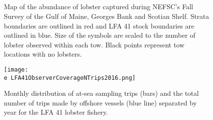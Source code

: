 \documentclass[11pt]{article}
\newcommand{\D}{.}
\newcommand{\e}{/backup/bio_data/bio.lobster/figures/} %
\begin{document}
        \begin{figure}
        \centering
        \\
        \\
        \\
        \\


         \caption{Map of the abundance of lobster captured during NEFSC's Fall Survey of the Gulf of Maine, Georges Bank and Scotian Shelf. Strata boundaries are outlined in red and LFA 41 stock boundaries are outlined in blue. Size of the symbols are scaled to the number of lobster observed within each tow. Black points represent tow locations with no lobsters.}
        \end{figure}
        \clearpage



        \begin{figure}
        \centering
        \texttt{[image: \\e LFA41ObserverCoverageNTrips2016.png]}
        \caption{Monthly distribution of at-sea sampling trips (bars) and the total number of trips made by offshore vessels (blue line) separated by year for the LFA 41 lobster fishery.} 
        \end{figure}
        \clearpage
\end{document}
